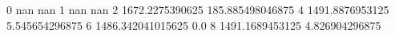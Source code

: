 0 nan nan
1 nan nan
2 1672.2275390625 185.885498046875
4 1491.8876953125 5.545654296875
6 1486.342041015625 0.0
8 1491.1689453125 4.826904296875
